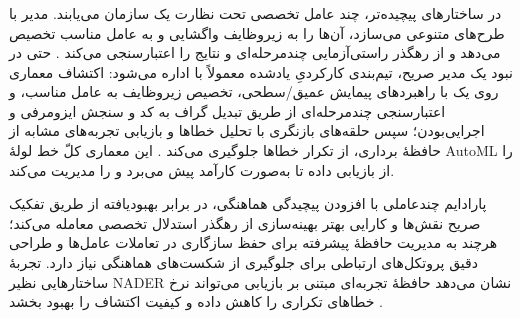 \subsubsection{\protect{}}
در ساختارهای پیچیده‌تر، چند عامل تخصصی تحت نظارت یک  سازمان می‌یابند. مدیر با  طرح‌های متنوعی می‌سازد، آن‌ها را به زیروظایف  واگشایی و به عامل مناسب تخصیص می‌دهد و از رهگذر راستی‌آزمایی چندمرحله‌ای و  نتایج را اعتبارسنجی می‌کند \cite{trirat2025automlagent}. حتی در نبود یک مدیر صریح، تیم‌بندی کارکردیِ یادشده معمولاً با  اداره می‌شود: اکتشاف معماری روی یک  با راهبردهای پیمایش عمیق/سطحی، تخصیص زیروظایف به عامل مناسب، و اعتبارسنجی چندمرحله‌ای از طریق تبدیل گراف به کد و سنجش ایزومرفی و اجرایی‌بودن؛ سپس حلقه‌های بازنگری با تحلیل خطاها و بازیابی تجربه‌های مشابه از حافظهٔ برداری، از تکرار خطاها جلوگیری می‌کند \cite{Yang2025NADER}. این معماری کلّ خط لولهٔ AutoML را از بازیابی داده تا  به‌صورت کارآمد پیش می‌برد و  را مدیریت می‌کند.

پارادایم چندعاملی با افزودن پیچیدگی هماهنگی، در برابر  بهبود‌یافته از طریق تفکیک صریح نقش‌ها و کارایی بهتر بهینه‌سازی از رهگذر استدلال تخصصی معامله می‌کند؛ هرچند به مدیریت حافظهٔ پیشرفته برای حفظ سازگاری در تعاملات عامل‌ها و طراحی دقیق پروتکل‌های ارتباطی برای جلوگیری از شکست‌های هماهنگی نیاز دارد. تجربهٔ ساختارهایی نظیر NADER نشان می‌دهد حافظهٔ تجربه‌ای مبتنی بر بازیابی می‌تواند نرخ خطاهای تکراری را کاهش داده و کیفیت اکتشاف را بهبود بخشد \cite{Yang2025NADER}.